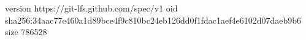 version https://git-lfs.github.com/spec/v1
oid sha256:34aac77e460a1d89bce4f9c810bc24eb126dd0f1fdac1aef4e6102d07daeb9b6
size 786528
